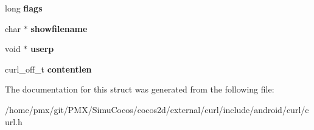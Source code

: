 \begin{DoxyCompactItemize}
\mbox{\label{structcurl__httppost_a937965b8a5e172edabdc08768ff0c76a}} 
long {\bfseries flags}
\item 
\mbox{\label{structcurl__httppost_ae0a1bc4573ef6ec4104210fe15ae9506}} 
char $\ast$ {\bfseries showfilename}
\item 
\mbox{\label{structcurl__httppost_a35b36904c4194e1e66c1101400d043f8}} 
void $\ast$ {\bfseries userp}
\item 
\mbox{\label{structcurl__httppost_a4bdef380aab958fe54b65e0c42d91116}} 
curl\+\_\+off\+\_\+t {\bfseries contentlen}
\end{DoxyCompactItemize}


The documentation for this struct was generated from the following file\+:\begin{DoxyCompactItemize}
\item 
/home/pmx/git/\+P\+M\+X/\+Simu\+Cocos/cocos2d/external/curl/include/android/curl/curl.\+h\end{DoxyCompactItemize}
